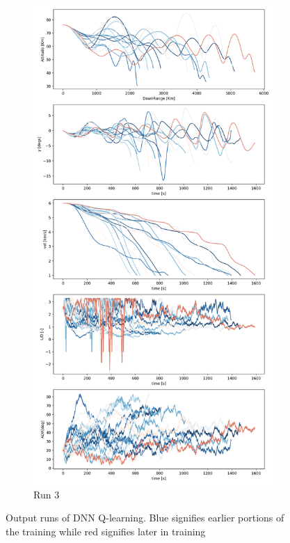 \documentclass[11pt]{article} %
\begin{document}
\begin{figure}[H]
\begin{subfigure}[b]{0.5\textwidth}
   \end{subfigure}
   \begin{subfigure}[b]{0.5\textwidth}
     \centering
     \includegraphics[width=\textwidth]{images/run_3.png}
     \caption{ Run 3}
     \label{fig:run_3}

   \end{subfigure}
   \caption{Output runs of DNN Q-learning. Blue signifies earlier portions of the training while red signifies later in training}
   \label{fig:training_data_plots}

\end{figure}
\end{document}
